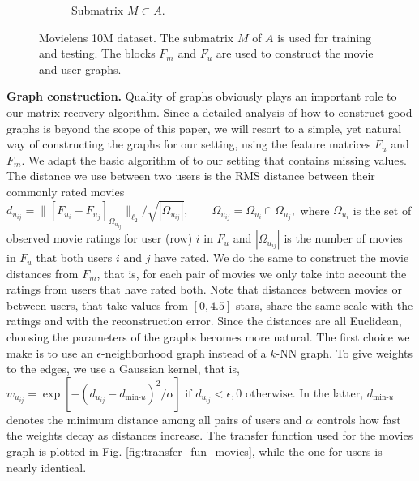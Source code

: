\documentclass{article}
\begin{document}
\begin{figure}
\begin{subfigure}[b]{.5\linewidth}
	\vspace{-0.2cm}
            \caption{Submatrix $M\subset A$.}\label{fig:part_movielens}
	\vspace{-0.15cm}
          \end{subfigure}
          \caption{Movielens 10M dataset. The submatrix $M$ of $A$ is used for training and testing. The blocks $F_m$ and $F_u$ are used to construct the movie and user graphs.}\label{fig:movielens}
	\vspace{-0.25cm}
\end{figure}


{\bf Graph construction.}
Quality of graphs obviously plays an important role to our matrix recovery algorithm. Since a detailed analysis of how to construct good graphs is beyond the scope of this paper, we will resort to a simple, yet natural way of constructing the graphs for our setting, using the feature matrices $F_u$ and $F_m$. We adapt the basic algorithm of \cite{belkin2003laplacian} to our setting that contains missing values. \\
The distance we use between two users is the RMS distance between their commonly rated movies
$d_{u_{ij}} = \|\left[F_{u_i} - F_{u_j}\right]_{\Omega_{u_{ij}}}\|_{\ell_2} / \sqrt{|\Omega_{u_{ij}}|}, \qquad\Omega_{u_{ij}} = \Omega_{u_i} \cap \Omega_{u_j},$ where $\Omega_{u_i}$ is the set of observed movie ratings for user (row) $i$ in $F_u$ and $|\Omega_{u_{ij}}|$ is the number of movies in $F_u$ that both users $i$ and $j$ have rated. We do the same to construct the movie distances from $F_m$, that is, for each pair of movies we only take into account the ratings from users that have rated both. Note that distances between movies or between users, that take values from $[0, 4.5]$ stars, share the same scale with the ratings and with the reconstruction error. Since the distances are all Euclidean, choosing the parameters of the graphs becomes more natural. The first choice we make is to use an $\epsilon$-neighborhood graph instead of a $k$-NN graph. To give weights to the edges, we use a Gaussian kernel, that is, $w_{u_{ij}} = \exp\left[-\left(d_{u_{ij}} - d_{\text{min-}u}\right)^2/\alpha\right] \text{ if } d_{u_{ij}} < \epsilon, 0 \text{ otherwise}$. In the latter, $d_{\text{min-}u}$ denotes the minimum distance among all pairs of users and $\alpha$ controls how fast the weights decay as distances increase. The transfer function used for the movies graph is plotted in Fig. \ref{fig:transfer_fun_movies}, while the one for users is nearly identical.\\
\end{document}
